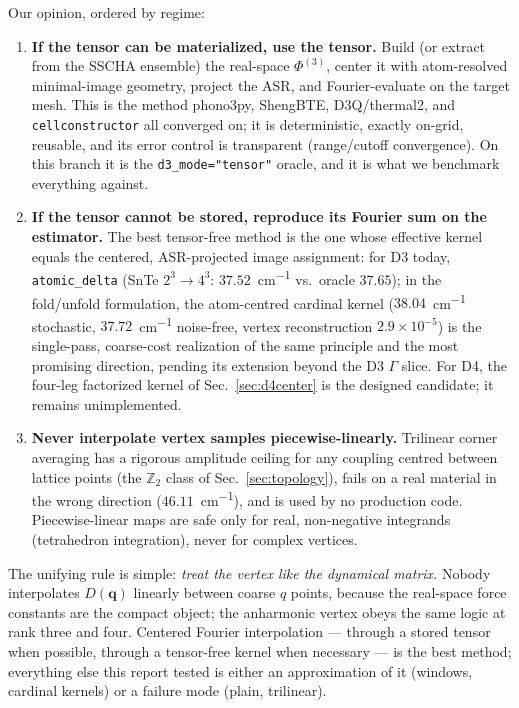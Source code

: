 \documentclass[11pt,a4paper]{article}
\newcommand{\qv}{\mathbf{q}}
\begin{document}
Our opinion, ordered by regime:
\begin{enumerate}
\item \textbf{If the tensor can be materialized, use the tensor.}  Build
  (or extract from the SSCHA ensemble) the real-space $\Phi^{(3)}$,
  center it with atom-resolved minimal-image geometry, project the ASR,
  and Fourier-evaluate on the target mesh.  This is the method
  phono3py, ShengBTE, D3Q/thermal2, and \texttt{cellconstructor} all
  converged on; it is deterministic, exactly on-grid, reusable, and its
  error control is transparent (range/cutoff convergence).  On this
  branch it is the \texttt{d3\_mode="tensor"} oracle, and it is what we
  benchmark everything against.
\item \textbf{If the tensor cannot be stored, reproduce its Fourier sum
  on the estimator.}  The best tensor-free method is the one whose
  effective kernel equals the centered, ASR-projected image assignment:
  for D3 today, \texttt{atomic\_delta} (SnTe $2^3\to4^3$:
  $37.52$~\si{cm^{-1}} vs.\ oracle $37.65$); in the fold/unfold
  formulation, the atom-centred cardinal kernel
  ($38.04$~\si{cm^{-1}} stochastic, $37.72$~\si{cm^{-1}} noise-free,
  vertex reconstruction $2.9\times10^{-5}$) is the single-pass,
  coarse-cost realization of the same principle and the most promising
  direction, pending its extension beyond the D3 $\Gamma$ slice.  For
  D4, the four-leg factorized kernel of Sec.~\ref{sec:d4center} is the
  designed candidate; it remains unimplemented.
\item \textbf{Never interpolate vertex samples piecewise-linearly.}
  Trilinear corner averaging has a rigorous amplitude ceiling for any
  coupling centred between lattice points (the $\mathbb Z_2$ class of
  Sec.~\ref{sec:topology}), fails on a real material in the wrong
  direction ($46.11$~\si{cm^{-1}}), and is used by no production code.
  Piecewise-linear maps are safe only for real, non-negative integrands
  (tetrahedron integration), never for complex vertices.
\end{enumerate}
The unifying rule is simple: \emph{treat the vertex like the dynamical
matrix.}  Nobody interpolates $D(\qv)$ linearly between coarse $q$
points, because the real-space force constants are the compact object;
the anharmonic vertex obeys the same logic at rank three and four.
Centered Fourier interpolation --- through a stored tensor when
possible, through a tensor-free kernel when necessary --- is the best
method; everything else this report tested is either an approximation of
it (windows, cardinal kernels) or a failure mode (plain, trilinear).
\end{document}
